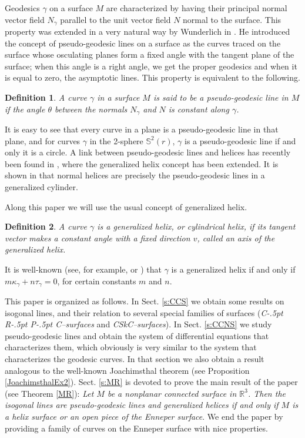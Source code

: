 \documentclass[11pt,a4paper]{article}
\def\R#1{\ensuremath{\mathbb{R}^{#1}}}
\def\S#1{\ensuremath{\mathbb{S}^{#1}}}
\def\g{\gamma}
\def\CRPC{C\kern-.5pt R\kern-.5pt P\kern-.5pt C}
\def\CSkC{CSkC}
\newtheorem{defi}{Definition}
\begin{document}
Geodesics $\g$ on a surface $M$ are characterized by having their principal normal vector field $N_\gamma$ parallel to the unit vector field $N$ normal to the surface. This property was extended in a very natural way by Wunderlich in \cite{W49a,W49b,W50,W51}.
He introduced the concept of pseudo-geodesic lines on a surface as the curves traced on the surface whose osculating planes form a fixed angle with the tangent plane of the surface; when this angle is a right angle, we get the proper geodesics and when it is equal to zero, the asymptotic lines. This property is equivalent to the following.
\begin{defi}
A curve $\g$ in a surface $M$ is said to be a \emph{pseudo-geodesic line in $M$} if the angle $\theta$ between the normals $N_\gamma$ and $N$ is constant along $\gamma$.
\end{defi}
It is easy to see that every curve in a plane is a pseudo-geodesic line in that plane, and for curves $\g$ in the 2-sphere $\S2(r)$, $\g$ is a pseudo-geodesic line if and only it is a circle.
A link between pseudo-geodesic lines and helices has recently been found in \cite{LO23}, where the generalized helix concept has been extended. It is shown in \cite{LO23} that normal helices are precisely the pseudo-geodesic lines in a generalized cylinder.

Along this paper we will use the usual concept of generalized helix.
\begin{defi}
A curve $\gamma$ is a \emph{generalized helix}, or \emph{cylindrical helix}, if its tangent vector makes a constant angle with a fixed direction $v$, called an axis of the generalized helix.
\end{defi}
It is well-known (see, for example, \cite[p. 20]{Eis09} or \cite[p. 26]{DoCarmo76}) that $\gamma$ is a generalized helix if and only if $m\kappa_\gamma+n\tau_\gamma=0$, for certain constants $m$ and $n$.

This paper is organized as follows. In Sect. \ref{s:CCS} we obtain some results on isogonal lines, and their relation to several special families of surfaces (\emph{\CRPC--surfaces} and \emph{\CSkC--surfaces}). In Sect. \ref{s:CCNS} we study pseudo-geodesic lines and obtain the system of differential equations that characterizes them, which obviously is very similar to the system that characterizes the geodesic curves. In that section we also obtain a result analogous to the well-known Joachimsthal theorem (see Proposition \ref{JoachimsthalEx2}). Sect. \ref{s:MR} is devoted to prove the main result of the paper (see Theorem \ref{MR}): \emph{Let $M$ be a nonplanar connected surface in $\R3$. Then the isogonal lines are pseudo-geodesic lines and generalized helices if and only if $M$ is a helix surface or an open piece of the Enneper surface}. We end the paper by providing a family of curves on the Enneper surface with nice properties.
\end{document}
